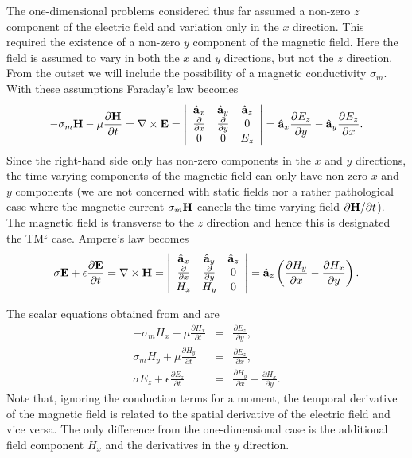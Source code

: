 The one-dimensional problems considered thus far assumed a non-zero
$z$ component of the electric field and variation only in the $x$
direction.  This required the existence of a non-zero $y$ component of
the magnetic field.  Here the field is assumed to vary in both the $x$
and $y$ directions, but not the $z$ direction.  From the outset we
will include the possibility of a magnetic conductivity $\sigma_m$.
With these assumptions Faraday's law becomes
\begin{equation}
  -\sigma_m\mathbf{H} -\mu \frac{\partial \mathbf{H}}{\partial t} =
  \nabla \times \mathbf{E} =
  \left|
  \begin{array}{ccc}
     \hat{\mathbf{a}}_{x} & \hat{\mathbf{a}}_{y} & \hat{\mathbf{a}}_{z} \\
     \frac{\partial}{\partial x} & \frac{\partial}{\partial y}  & 0 \\
     0 & 0 & E_z
  \end{array}
  \right|
  = \hat{\mathbf{a}}_{x}\frac{\partial E_z}{\partial y}
   -\hat{\mathbf{a}}_{y}\frac{\partial E_z}{\partial x}.
 \label{eq:faradayTMz}
\end{equation}
Since the right-hand side only has non-zero components in the $x$ and
$y$ directions, the time-varying components of the magnetic field can
only have non-zero $x$ and $y$ components (we are not concerned with
static fields nor a rather pathological case where the magnetic
current $\sigma_m\mathbf{H}$ cancels the time-varying field
$\partial\mathbf{H}/\partial t$).  The magnetic field is transverse to the
$z$ direction and hence this is designated the TM$^z$ case.  Ampere's
law becomes
\begin{equation}
  \sigma \mathbf{E} + \epsilon \frac{\partial \mathbf{E}}{\partial t} =
  \nabla \times \mathbf{H} =
  \left|
  \begin{array}{ccc}
     \hat{\mathbf{a}}_{x} & \hat{\mathbf{a}}_{y} & \hat{\mathbf{a}}_{z} \\
     \frac{\partial}{\partial x} & \frac{\partial}{\partial y}  & 0 \\
     H_x & H_y & 0
  \end{array}
  \right|
  = \hat{\mathbf{a}}_{z}\left(\frac{\partial H_y}{\partial x}
                    -\frac{\partial H_x}{\partial y}\right).
 \label{eq:ampereTMz}
\end{equation}

The scalar equations obtained from  and
 are
\begin{eqnarray}
  -\sigma_m H_x - \mu\frac{\partial H_x}{\partial t} &=&
    \frac{\partial E_z}{\partial y},  \label{eq:faradayTMzX}
  \\
  \sigma_m H_y + \mu\frac{\partial H_y}{\partial t} &=&
    \frac{\partial E_z}{\partial x}, \label{eq:faradayTMzY}
  \\
  \sigma E_z + \epsilon\frac{\partial E_z}{\partial t} &=&
     \frac{\partial H_y}{\partial x}
    -\frac{\partial H_x}{\partial y}. \label{eq:ampereTMzZ}
\end{eqnarray}
Note that, ignoring the conduction terms for a moment, the temporal
derivative of the magnetic field is related to the spatial derivative
of the electric field and vice versa.  The only difference from the
one-dimensional case is the additional field component $H_x$ and 
the derivatives in the $y$ direction.


